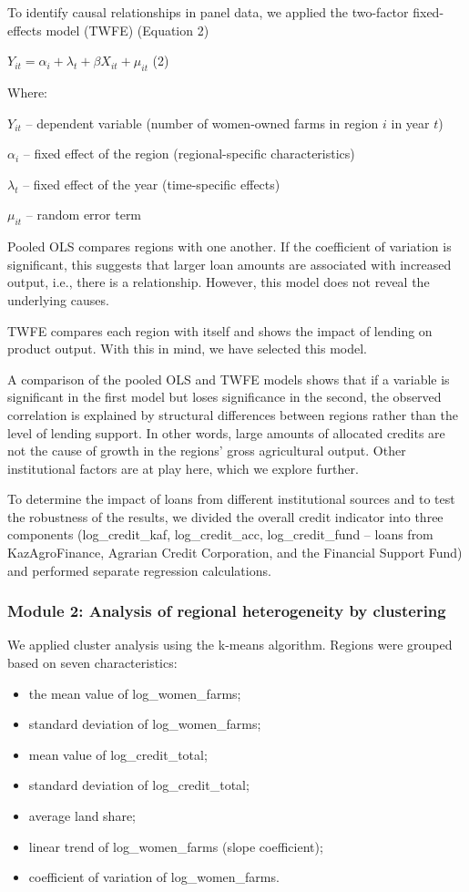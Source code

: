 ﻿\documentclass[pdflatex,sn-mathphys-ay]{sn-jnl}
\begin{document}
To identify causal relationships in panel data, we applied the
two-factor fixed-effects model (TWFE) (Equation 2)

$Y_{it} = \alpha_i + \lambda_t + \beta X_{it} + \mu_{it}$ (2)

Where:

$Y_{it}$ -- dependent variable (number of women-owned farms in region $i$ in year $t$)

$\alpha_i$ -- fixed effect of the region (regional-specific characteristics)

$\lambda_t$ -- fixed effect of the year (time-specific effects)

$\mu_{it}$ -- random error term

Pooled OLS compares regions with one another. If the coefficient of
variation is significant, this suggests that larger loan amounts are
associated with increased output, i.e., there is a relationship.
However, this model does not reveal the underlying causes.

TWFE compares each region with itself and shows the impact of lending on
product output. With this in mind, we have selected this model.

A comparison of the pooled OLS and TWFE models shows that if a variable
is significant in the first model but loses significance in the second,
the observed correlation is explained by structural differences between
regions rather than the level of lending support. In other words, large
amounts of allocated credits are not the cause of growth in the regions'
gross agricultural output. Other institutional factors are at play here,
which we explore further.

To determine the impact of loans from different institutional sources
and to test the robustness of the results, we divided the overall credit
indicator into three components (log\_credit\_kaf, log\_credit\_acc,
log\_credit\_fund -- loans from KazAgroFinance, Agrarian Credit
Corporation, and the Financial Support Fund) and performed separate
regression calculations.

\subsubsection{Module 2: Analysis of regional heterogeneity by clustering}

We applied cluster analysis using the k-means algorithm. Regions were
grouped based on seven characteristics:

\begin{itemize}
\item the mean value of log\_women\_farms;
\item standard deviation of log\_women\_farms;
\item mean value of log\_credit\_total;
\item standard deviation of log\_credit\_total;
\item average land share;
\item linear trend of log\_women\_farms (slope coefficient);
\item coefficient of variation of log\_women\_farms.
\end{itemize}
\end{document}
